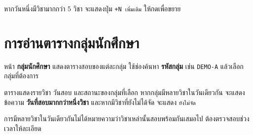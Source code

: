 \begin{expected}
หากวันหนึ่งมีวิชามากกว่า 5 วิชา จะแสดงปุ่ม \texttt{+N เพิ่มเติม} ให้กดเพื่อขยาย
\end{expected}


\section{การอ่านตารางกลุ่มนักศึกษา}

หน้า \textbf{กลุ่มนักศึกษา} แสดงตารางสอบของแต่ละกลุ่ม ใช้ช่องค้นหา
\textbf{รหัสกลุ่ม} เช่น \texttt{DEMO-A} แล้วเลือกกลุ่มที่ต้องการ

\begin{expected}
ตารางแสดงรายวิชา วันสอบ และสถานะของกลุ่มที่เลือก
หากกลุ่มมีหลายวิชาในวันเดียวกัน จะแสดงข้อความ \textbf{วันที่สอบมากกว่าหนึ่งวิชา}
และหากมีวิชาที่ยังไม่ได้จัด จะแสดง \texttt{ยังไม่จัด}
\end{expected}


\begin{note}
การมีหลายวิชาในวันเดียวกันไม่ได้หมายความว่าวิชาเหล่านั้นสอบพร้อมกันเสมอไป
ต้องตรวจสอบช่วงเวลาให้ละเอียด
\end{note}

